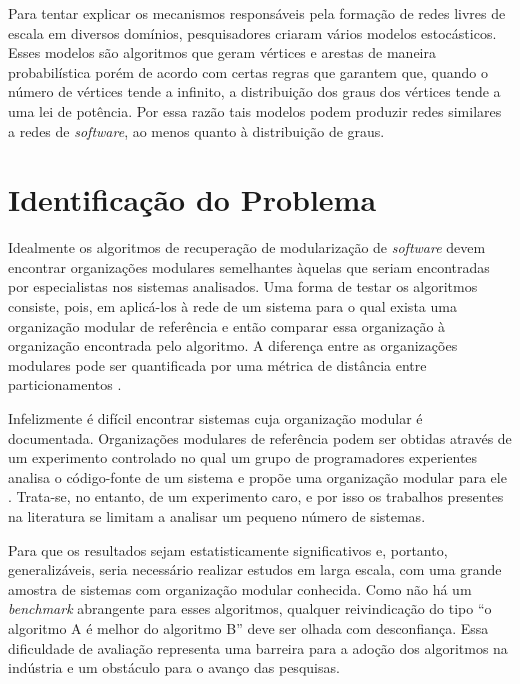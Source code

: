 \documentclass[12pt]{article}
\begin{document}
Para tentar explicar os mecanismos responsáveis pela formação de redes livres de
escala em diversos domínios, pesquisadores criaram vários modelos estocásticos.
Esses modelos são algoritmos que geram vértices e arestas de maneira
probabilística porém de acordo com certas regras que garantem que, quando o
número de vértices tende a infinito, a distribuição dos graus dos vértices tende
a uma lei de potência. Por essa razão tais modelos podem produzir redes
similares a redes de \emph{software}, ao menos quanto à distribuição de graus.

\section{Identificação do Problema} 


Idealmente os algoritmos de recuperação de modularização de \emph{software}
devem encontrar organizações modulares semelhantes àquelas que seriam
encontradas por especialistas nos sistemas analisados. Uma forma de testar os
algoritmos consiste, pois, em aplicá-los à rede de um sistema para o qual
exista uma organização modular de referência e então comparar essa organização
à organização encontrada pelo algoritmo. A diferença entre as organizações
modulares pode ser quantificada por uma métrica de distância entre
particionamentos \cite{Tzerpos1999}.

Infelizmente é difícil encontrar sistemas cuja organização modular é
documentada. Organizações modulares de referência podem ser obtidas através de
um experimento controlado no qual um grupo de programadores experientes analisa
o código-fonte de um sistema e propõe uma organização modular para ele
\cite{Koschke2000}. Trata-se, no entanto, de um experimento caro, e por isso os
trabalhos presentes na literatura se limitam a analisar um pequeno número de
sistemas\cite{Wu2005}.



Para que os resultados sejam estatisticamente significativos e, portanto,
generalizáveis, seria necessário realizar estudos em larga escala, com uma
grande amostra de sistemas com organização modular conhecida. Como não há um
\emph{benchmark} abrangente para esses algoritmos, qualquer reivindicação do
tipo ``o algoritmo A é melhor do algoritmo B'' deve ser olhada com
desconfiança. Essa dificuldade de avaliação representa uma barreira para a
adoção dos algoritmos na indústria e um obstáculo para o avanço das pesquisas.
\end{document}
